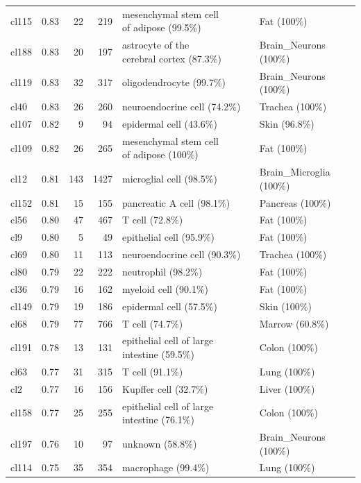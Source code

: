 \begin{table}[ht!]
\begin{tabular}{lrrrll}
  cl115 & 0.83 &  22 & 219 & \specialcell[t]{mesenchymal stem cell\\of adipose (99.5\%)} & Fat (100\%) \\ 
  cl188 & 0.83 &  20 & 197 & \specialcell[t]{astrocyte of the\\cerebral cortex (87.3\%)} & Brain\_Neurons (100\%) \\ 
  cl119 & 0.83 &  32 & 317 & oligodendrocyte (99.7\%) & Brain\_Neurons (100\%) \\ 
  cl40 & 0.83 &  26 & 260 & neuroendocrine cell (74.2\%) & Trachea (100\%) \\ 
  cl107 & 0.82 &   9 &  94 & epidermal cell (43.6\%) & Skin (96.8\%) \\ 
  cl109 & 0.82 &  26 & 265 & \specialcell[t]{mesenchymal stem cell\\of adipose (100\%)} & Fat (100\%) \\ 
  cl12 & 0.81 & 143 & 1427 & microglial cell (98.5\%) & Brain\_Microglia (100\%) \\ 
  cl152 & 0.81 &  15 & 155 & pancreatic A cell (98.1\%) & Pancreas (100\%) \\ 
  cl56 & 0.80 &  47 & 467 & T cell (72.8\%) & Fat (100\%) \\ 
  cl9 & 0.80 &   5 &  49 & epithelial cell (95.9\%) & Fat (100\%) \\ 
  cl69 & 0.80 &  11 & 113 & neuroendocrine cell (90.3\%) & Trachea (100\%) \\ 
  cl80 & 0.79 &  22 & 222 & neutrophil (98.2\%) & Fat (100\%) \\ 
  cl36 & 0.79 &  16 & 162 & myeloid cell (90.1\%) & Fat (100\%) \\ 
  cl149 & 0.79 &  19 & 186 & epidermal cell (57.5\%) & Skin (100\%) \\ 
  cl68 & 0.79 &  77 & 766 & T cell (74.7\%) & Marrow (60.8\%) \\ 
  cl191 & 0.78 &  13 & 131 & epithelial cell of large intestine (59.5\%) & Colon (100\%) \\ 
  cl63 & 0.77 &  31 & 315 & T cell (91.1\%) & Lung (100\%) \\ 
  cl2 & 0.77 &  16 & 156 & Kupffer cell (32.7\%) & Liver (100\%) \\
  cl158 & 0.77 &  25 & 255 & epithelial cell of large intestine (76.1\%) & Colon (100\%) \\ 
  cl197 & 0.76 &  10 &  97 & unknown (58.8\%) & Brain\_Neurons (100\%) \\ 
  cl114 & 0.75 &  35 & 354 & macrophage (99.4\%) & Lung (100\%) \\ 

\end{tabular}
\end{table}
